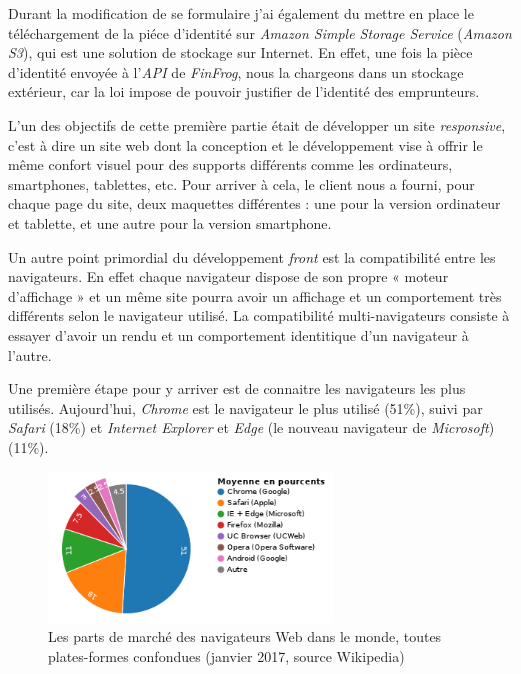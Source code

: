 \documentclass[12pt,a4paper]{article}
\begin{document}
  \bigskip

  Durant la modification de se formulaire j'ai également du mettre en
  place le téléchargement de la piéce d'identité sur \emph{Amazon Simple
  Storage Service} (\emph{Amazon S3}), qui est une solution de stockage
  sur Internet. En effet, une fois la pièce d'identité envoyée à
  l'\emph{API} de \emph{FinFrog}, nous la chargeons dans un stockage
  extérieur, car la loi impose de pouvoir justifier de l'identité des
  emprunteurs.

  \bigskip

  L'un des objectifs de cette première partie était de développer un site
  \emph{responsive}, c'est à dire un site web dont la conception et le
  développement vise à offrir le même confort visuel pour des supports
  différents comme les ordinateurs, smartphones, tablettes, etc. Pour
  arriver à cela, le client nous a fourni, pour chaque page du site, deux
  maquettes différentes : une pour la version ordinateur et tablette, et
  une autre pour la version smartphone.

  \bigskip

  Un autre point primordial du développement \emph{front} est la
  compatibilité entre les navigateurs. En effet chaque navigateur dispose
  de son propre « moteur d'affichage » et un même site pourra avoir un
  affichage et un comportement très différents selon le navigateur
  utilisé. La compatibilité multi-navigateurs consiste à essayer d'avoir
  un rendu et un comportement identitique d'un navigateur à l'autre.

  \bigskip

  Une première étape pour y arriver est de connaitre les navigateurs les
  plus utilisés. Aujourd'hui, \emph{Chrome} est le navigateur le plus
  utilisé (51\%), suivi par \emph{Safari} (18\%) et \emph{Internet
  Explorer} et \emph{Edge} (le nouveau navigateur de \emph{Microsoft})
  (11\%).

  \begin{figure}[h]
    \centering
    \includegraphics[height=4cm]{figures/browsers.png}
    \caption{Les parts de marché des navigateurs Web dans le monde, toutes plates-formes confondues (janvier 2017, source Wikipedia)}
  \end{figure}
\end{document}
